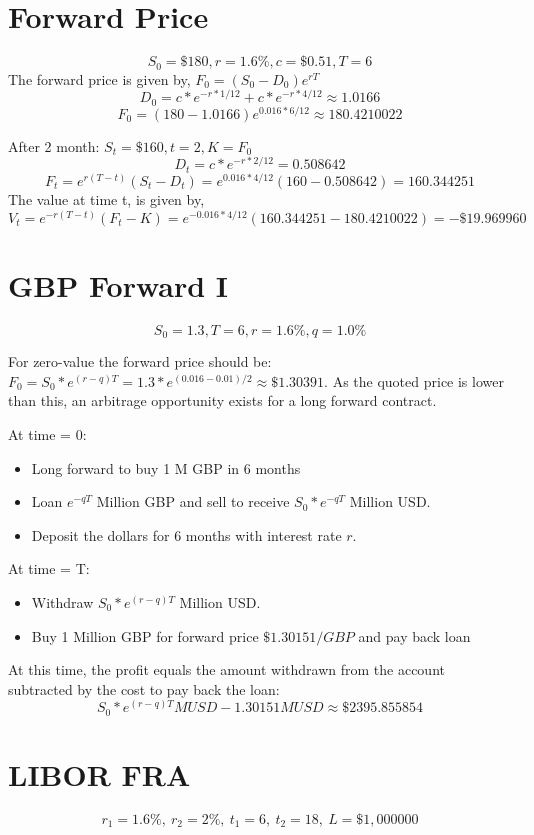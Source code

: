 \documentclass{article}
\begin{document}
\thispagestyle{fancy}


\section{Forward Price}

$$S_0 = \$180, r = 1.6\%, c = \$0.51, T = 6$$
The forward price is given by, $F_0 = (S_0 - D_0)e^{rT}$
$$D_0 = c*e^{-r * 1/12} + c*e^{-r * 4/12} \approx 1.0166 $$
$$F_0 = (180 - 1.0166)e^{0.016 * 6/12} \approx 180.4210022$$

After 2 month: $S_t = \$160, t=2, K=F_0$
$$D_t = c * e^{-r * 2/12} = 0.508642$$
$$F_t = e^{r(T-t)}(S_t - D_t) = e^{0.016 * 4/12}(160-0.508642) = 160.344251$$
The value at time t, is given by,
$$V_t = e^{-r(T-t)}(F_t - K) = e^{-0.016 * 4/12}(160.344251-180.4210022) = -\$19.969960$$

\section{GBP Forward I}

$$S_0 = 1.3, T=6, r = 1.6\%, q = 1.0\%$$

For zero-value the forward price should be: $F_0 = S_0*e^{(r-q)T} = 1.3 * e^{(0.016-0.01)/2} \approx \$1.30391 $. As the quoted price is lower than this, an arbitrage opportunity exists for a long forward contract.

At time = 0: 
\begin{itemize}
	\item Long forward to buy 1 M GBP in 6 months
	\item Loan $e^{-qT}$ Million GBP and sell to receive $S_0*e^{-qT}$ Million USD.
	\item Deposit the dollars for 6 months with interest rate $r$.
\end{itemize}

At time = T: 
\begin{itemize}
	\item Withdraw $S_0 * e^{(r-q)T}$ Million USD.
	\item Buy 1 Million GBP for forward price $\$1.30151/GBP$ and pay back loan
\end{itemize}
At this time, the profit equals the amount withdrawn from the account subtracted by the cost to pay back the loan:
$$ S_0 * e^{(r-q)T} MUSD - 1.30151 MUSD \approx \$2395.855854$$

\section{LIBOR FRA}
$$r_1 = 1.6\%, \ r_2 = 2\%, \ t_1 = 6, \ t_2 = 18, \ L = \$1,000000$$
\end{document}
